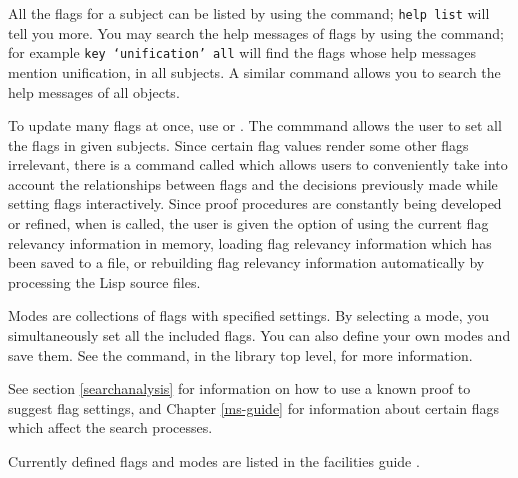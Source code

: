 All the flags for a subject can be listed by using the  command;
{\tt help list} will tell you more. You may search the help messages of flags by
using the  command; for example {\tt key `unification' all} will
find the flags whose help messages mention unification, in all subjects. A similar
command  allows you to search the help messages of all {\TPS}
objects.

To update many flags at once, use  or 
.
The  commmand 
allows the user to set all the flags in given subjects.
Since certain flag values render some other flags
irrelevant, there is a command called  which
allows users to conveniently take into account the relationships
between flags and the decisions previously made while setting flags
interactively.  Since proof procedures are constantly being developed
or refined, when  is called, the user is given the
option of using the current flag relevancy information in memory,
loading flag relevancy information which has been saved to a file, or
rebuilding flag relevancy information automatically by processing the Lisp
source files.  

Modes are collections of flags with specified settings.  By selecting a
mode, you simultaneously set all the included flags.  You can also
define your own modes and save them.  See the  command,
in the library top level, for more information.

See section \ref{searchanalysis} for information on how to use
a known proof to suggest {\TPS} flag settings, and Chapter
\ref{ms-guide} for information about certain flags which affect the
search processes.

Currently defined flags and modes are listed in the facilities guide
\cite{AndrewsTPS88e}.



